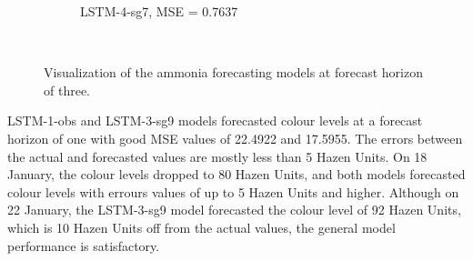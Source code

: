 \begin{figure}[!ht]
\begin{subfigure}[t]{0.75\textwidth}
    \caption{LSTM-4-sg7, MSE = 0.7637} \label{fig:nh3-lstm-4-fc3}
  \end{subfigure}\\
\caption{Visualization of the ammonia forecasting models at forecast horizon of three.} \label{fig:nh3-forecast-fc3}
\end{figure}

LSTM-1-obs and LSTM-3-sg9 models forecasted colour levels at a forecast horizon of one with good MSE values of 22.4922 and 17.5955. The errors between the actual and forecasted values are mostly less than 5 Hazen Units. On 18 January, the colour levels dropped to 80 Hazen Units, and both models forecasted colour levels with errours values of up to 5 Hazen Units and higher. Although on 22 January, the LSTM-3-sg9 model forecasted the colour level of 92 Hazen Units, which is 10 Hazen Units off from the actual values, the general model performance is satisfactory. 

